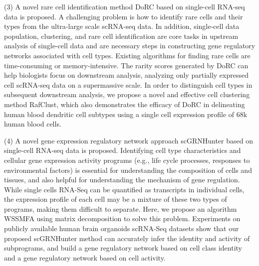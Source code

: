 \begin{abstracten}
(3) A novel rare cell identification method DoRC based on single-cell RNA-seq data is proposed.
A challenging problem is how to identify rare cells and their types from the ultra-large scale scRNA-seq data. 
In addition, single-cell data population, clustering, and rare cell identification are core tasks in upstream analysis of single-cell data and are necessary steps in constructing gene regulatory networks associated with cell types. 
Existing algorithms for finding rare cells are time-consuming or memory-intensive.
The rarity scores generated by DoRC can help biologists focus on downstream analysis, 
analyzing only partially expressed cell scRNA-seq data on a supermassive scale. 
In order to distinguish cell types in subsequent downstream analysis, we propose a novel and effective cell clustering method RafClust, 
which also demonstrates the efficacy of DoRC in delineating human blood dendritic cell subtypes using a single cell expression profile of 68k human blood cells. 

(4) A novel gene expression regulatory network approach scGRNHunter based on single-cell RNA-seq data is proposed. 
Identifying cell type characteristics and cellular gene expression activity programs (e.g., life cycle processes, responses to environmental factors) is essential for understanding the composition of cells and tissues,
and also helpful for understanding the mechanism of gene regulation. 
While single cells RNA-Seq can be quantified as transcripts in individual cells, 
the expression profile of each cell may be a mixture of these two types of programs, 
making them difficult to separate. 
Here, we propose an algorithm WSSMFA using matrix decomposition to solve this problem. 
Experiments on publicly available human brain organoids scRNA-Seq datasets show that our proposed scGRNHunter method can accurately infer the identity and activity of subprograms, 
and build a gene regulatory network based on cell class identity and a gene regulatory network based on cell activity.

\end{abstracten}